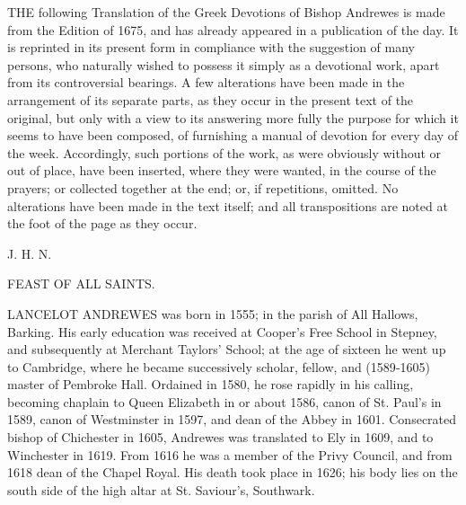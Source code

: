 


THE following Translation of the Greek Devotions of Bishop Andrewes is made from the Edition of 1675, and has already appeared in a publication of the day. It is reprinted in its present form in compliance with the suggestion of many persons, who naturally wished to possess it simply as a devotional work, apart from its controversial bearings. A few alterations have been made in the arrangement of its separate parts, as they occur in the present text of the original, but only with a view to its answering more fully the purpose for which it seems to have been composed, of furnishing a manual of devotion for every day of the week. Accordingly, such portions of the work, as were obviously without or out of place, have been inserted, where they were wanted, in the course of the prayers; or collected together at the end; or, if repetitions, omitted. No alterations have been made in the text itself; and all transpositions are noted at the foot of the page as they occur.

J. H. N.

\textsc{FEAST OF ALL SAINTS}.


LANCELOT ANDREWES was born in 1555; in the parish of All Hallows, Barking. His early education was received at Cooper’s Free School in Stepney, and subsequently at Merchant Taylors’ School; at the age of sixteen he went up to Cambridge, where he became successively scholar, fellow, and (1589‑1605) master of Pembroke Hall. Ordained in 1580, he rose rapidly in his calling, becoming chaplain to Queen Elizabeth in or about 1586, canon of St. Paul’s in 1589, canon of Westminster in 1597, and dean of the Abbey in 1601. Consecrated bishop of Chichester in 1605, Andrewes was translated to Ely in 1609, and to Winchester in 1619. From 1616 he was a member of the Privy Council, and from 1618 dean of the Chapel Royal. His death took  place in 1626; his body lies on the south side of the high altar at St. Saviour’s, Southwark.

